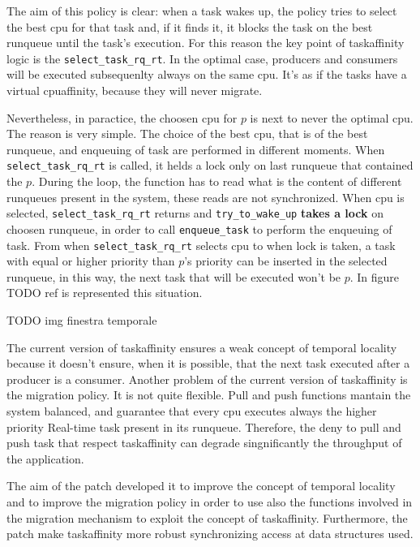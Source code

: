 The aim of this policy is clear: when a task wakes up, the policy tries to select the best cpu for that task and, if it finds it, it blocks the task on the 
best runqueue until the task's execution. For this reason the key point of taskaffinity logic is the \texttt{select\_task\_rq\_rt}. In the optimal case, 
producers and consumers will be executed subsequenlty always on the same cpu. It's as if the tasks have a virtual cpuaffinity, because they will never 
migrate.

Nevertheless, in paractice, the choosen cpu for $p$ is next to never the optimal cpu. The reason is very simple. The choice of the best 
cpu, that is of the best runqueue, and enqueuing of task are performed in different moments. When \texttt{select\_task\_rq\_rt} is called, it helds a lock 
only on last runqueue that contained the $p$. During the loop, the function has to read what is the content of different runqueues present in 
the system, these reads are not synchronized. When cpu is selected, \texttt{select\_task\_rq\_rt} returns and \texttt{try\_to\_wake\_up} \textbf{takes 
a lock} on choosen runqueue, in order to call \texttt{enqueue\_task} to perform the enqueuing of task. From when \texttt{select\_task\_rq\_rt} selects cpu 
to when lock is taken, a task with equal or higher priority than $p$'s priority can be inserted in the selected runqueue, in this way, the next task that 
will be executed won't be $p$. In figure TODO ref is represented this situation.

TODO img finestra temporale

The current version of taskaffinity ensures a weak concept of temporal locality because it doesn't ensure, when it is possible, that the next task executed 
after a producer is a consumer. Another problem of the current version of taskaffinity is the migration policy. It is not quite flexible. Pull and push 
functions mantain the system balanced, and guarantee that every cpu executes always the higher priority Real-time task present in its runqueue.
Therefore, the deny to pull and push task that respect taskaffinity can degrade singnificantly the throughput of the application.

The aim of the patch developed it to improve the concept of temporal locality and to improve the migration policy in order to use also the functions 
involved in the migration mechanism to exploit the concept of taskaffinity. Furthermore, the patch make taskaffinity more robust synchronizing access at 
data structures used.

